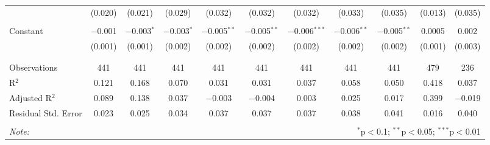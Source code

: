 \begin{table}[!htbp]
\begin{adjustbox}{width=1.25\textwidth}
\begin{tabular}{@{\extracolsep{5pt}}lcccccccccc}
  & (0.020) & (0.021) & (0.029) & (0.032) & (0.032) & (0.032) & (0.033) & (0.035) & (0.013) & (0.035) \\ 
  & & & & & & & & & & \\ 
 Constant & $-$0.001 & $-$0.003$^{*}$ & $-$0.003$^{*}$ & $-$0.005$^{**}$ & $-$0.005$^{**}$ & $-$0.006$^{***}$ & $-$0.006$^{**}$ & $-$0.005$^{**}$ & 0.0005 & 0.002 \\ 
  & (0.001) & (0.001) & (0.002) & (0.002) & (0.002) & (0.002) & (0.002) & (0.002) & (0.001) & (0.003) \\ 
  & & & & & & & & & & \\ 
\hline \\[-1.8ex] 
Observations & 441 & 441 & 441 & 441 & 441 & 441 & 441 & 441 & 479 & 236 \\ 
R$^{2}$ & 0.121 & 0.168 & 0.070 & 0.031 & 0.031 & 0.037 & 0.058 & 0.050 & 0.418 & 0.037 \\ 
Adjusted R$^{2}$ & 0.089 & 0.138 & 0.037 & $-$0.003 & $-$0.004 & 0.003 & 0.025 & 0.017 & 0.399 & $-$0.019 \\ 
Residual Std. Error & 0.023 & 0.025 & 0.034 & 0.037 & 0.037 & 0.037 & 0.038 & 0.041 & 0.016 & 0.040 \\ 
\hline 
\hline \\[-1.8ex] 
\textit{Note:}  & \multicolumn{10}{r}{$^{*}$p$<$0.1; $^{**}$p$<$0.05; $^{***}$p$<$0.01} \\ 
\end{tabular} 
\end{adjustbox} 
\end{table} 
